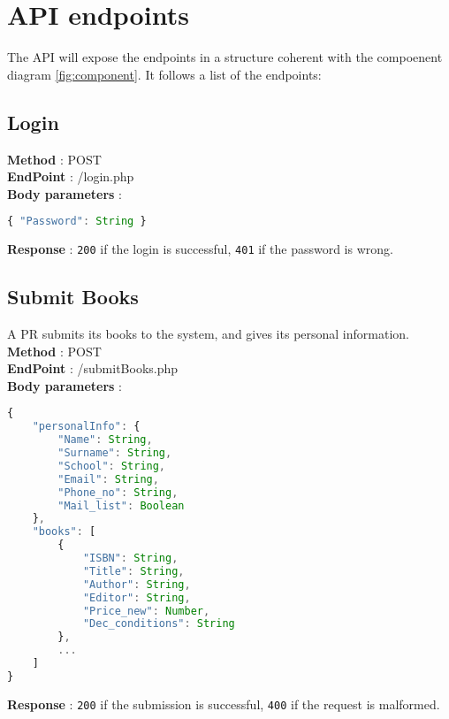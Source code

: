 \section{API endpoints}

The API will expose the endpoints in a structure coherent with the compoenent diagram \ref{fig:component}. It follows a list of the endpoints:

\subsection{Login}
\textbf{Method} : POST \\
\textbf{EndPoint} : /login.php \\
\textbf{Body parameters} :
\begin{lstlisting}[language=JavaScript, label={lst:jscode}, basicstyle=\ttfamily]
{ "Password": String }
\end{lstlisting}
\textbf{Response} : \texttt{200} if the login is successful, \texttt{401} if the password is wrong.

\subsection{Submit Books}
A PR submits its books to the system, and gives its personal information.\\
\textbf{Method} : POST \\
\textbf{EndPoint} : /submitBooks.php \\
\textbf{Body parameters} :
\begin{lstlisting}[language=JavaScript, label={lst:jscode}, basicstyle=\ttfamily]
{
    "personalInfo": {
        "Name": String,
        "Surname": String,
        "School": String,
        "Email": String,
        "Phone_no": String,
        "Mail_list": Boolean
    },
    "books": [
        {
            "ISBN": String,
            "Title": String,
            "Author": String,
            "Editor": String,
            "Price_new": Number,
            "Dec_conditions": String
        },
        ...
    ]
}
\end{lstlisting}
\textbf{Response} : \texttt{200} if the submission is successful, \texttt{400} if the request is malformed.

